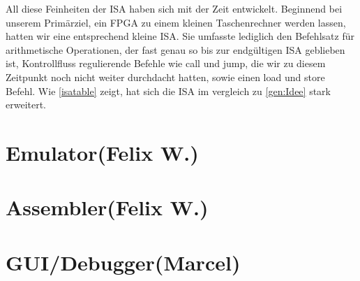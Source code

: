 All diese Feinheiten der ISA haben sich mit der Zeit entwickelt. Beginnend bei unserem Primärziel, ein FPGA zu einem kleinen Taschenrechner werden lassen, hatten wir eine entsprechend kleine ISA. Sie umfasste lediglich den Befehlsatz für arithmetische Operationen, der fast genau so bis zur endgültigen ISA geblieben ist, Kontrollfluss regulierende Befehle wie call und jump, die wir zu diesem Zeitpunkt noch nicht weiter durchdacht hatten, sowie einen load und store Befehl. Wie \ref{isatable} zeigt, hat sich die ISA im vergleich zu \autoref{gen:Idee} stark erweitert.

\section{Emulator(Felix W.)}
\section{Assembler(Felix W.)}
\section{GUI/Debugger(Marcel)}

